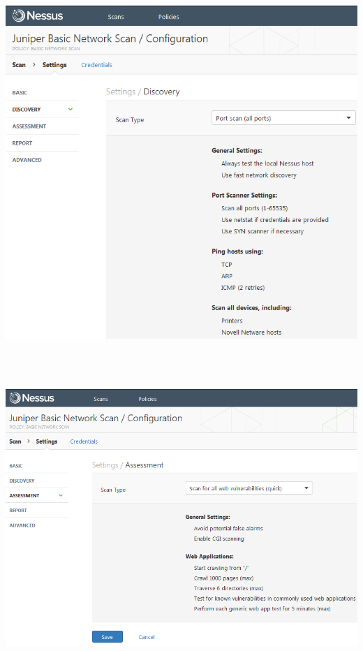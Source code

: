 \documentclass[11pt, a4paper]{article}
\begin{document}
$\;$ \\ \\
\noindent\begin{minipage}{\textwidth}
    \centering
    \includegraphics[width=\textwidth]{Nessus_2.png}
\end{minipage}
$\;$ \\ \\
\noindent\begin{minipage}{\textwidth}
    \centering
    \includegraphics[width=\textwidth]{Nessus_3.png}
\end{minipage}
\end{document}
